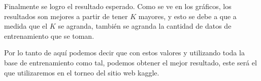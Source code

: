 Finalmente se logro el resultado esperado. Como se ve en los gráficos, los resultados son mejores a partir de tener $K$ mayores, y esto se debe a que a medida que el $K$ se agranda, también se agranda la cantidad de datos de entrenamiento que se toman.

Por lo tanto de aquí podemos decir que con estos valores y utilizando toda la base de entrenamiento como tal, podemos obtener el mejor resultado, este será el que utilizaremos en el torneo del sitio web kaggle.
